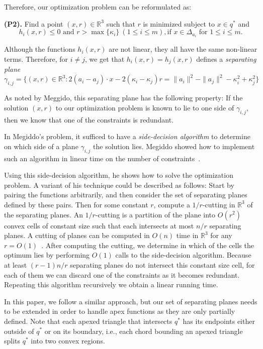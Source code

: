 \documentclass[a4paper,UKenglish]{lipics}
\begin{document}
Therefore, our optimization problem can be reformulated as:

\textbf{(P2).} Find a point $(x,r)\in \mathbb{R}^3$ such that $r$ is minimized subject to $x\in q^*$ and 
$$h_i(x, r) \leq 0 \text{ and } r > \max\{\kappa_i\}\ (1\leq i\leq m), \text{if $x\in \Delta_{a_i}$ for $1\leq i \leq m$}.$$

Although the functions $h_i(x,r)$ are not linear, they all have the same non-linear terms. Therefore, for $i\neq j$, we get that
$h_i(x,r) = h_j(x, r)$ defines a \emph{separating plane}
$$\gamma_{i,j} = \{(x, r) \in \mathbb{R}^3: 2 (a_i - a_j) \cdot x - 2( \kappa_i - \kappa_j) r = \|a_i\|^2 - \|a_j\|^2 - \kappa_i^2 + \kappa_j^2\}$$

As noted by Meggido, this separating plane has the following property:
If the solution $(x, r)$ to our optimization problem is known to lie to one side of $\gamma_{i,j}$, then we know that one of the constraints is redundant. 

In Megiddo's problem, it sufficed to have a \emph{side-decision algorithm} to determine on which side of a plane $\gamma_{i,j}$ the solution lies. Megiddo showed how to implement such an algorithm in linear time on the number of constraints~\cite{megiddo1989ball}.

Using this side-decision algorithm, he shows how to solve the optimization problem. A variant of his technique could be described as follows: Start by pairing the functions arbitrarily, and then consider the set of separating planes defined by these pairs.
Then for some constant $r$, compute a $1/r$-cutting in $\mathbb{R}^3$ of the separating planes.
An $1/r$-cutting is a partition of the plane into $O(r^2)$ convex cells of constant size such that each intersects at most $n/r$ separating planes.
A cutting of planes can be computed in $O(n)$ time in $\mathbb{R}^3$ for any $r = O(1)$~\cite{matousekCuttings}.
After computing the cutting, we determine in which of the cells the optimum lies by performing $O(1)$ calls to the side-decision algorithm. 
Because at least $(r-1)n/r$ separating planes do not intersect this constant size cell, for each of them we can discard one of the constraints as it becomes redundant. Repeating this algorithm recursively we obtain a linear running time.

In this paper, we follow a similar approach, but our set of separating planes needs to be extended in order to handle apex functions as they are only partially defined.
Note that each apexed triangle that intersects $q^*$ has its endpoints either outside of $q^*$ or on its boundary, i.e., each chord bounding an apexed triangle splits $q^*$ into two convex regions.
\end{document}
